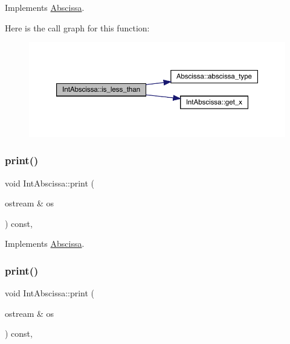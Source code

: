 Implements \mbox{\hyperlink{classAbscissa_a399c2f7a1309368b477c767ff5f63927}{Abscissa}}.

Here is the call graph for this function\+:
\nopagebreak
\begin{figure}[H]
\begin{center}
\leavevmode
\includegraphics[width=350pt]{d1/dd9/classIntAbscissa_a8aba17c6dc640344c56cd520d6c28be2_cgraph}
\end{center}
\end{figure}
\mbox{\label{classIntAbscissa_af26b6be609db09fbe544502b6606cff8}} 
\subsubsection{\texorpdfstring{print()}{print()}\hspace{0.1cm}{\footnotesize\ttfamily [1/2]}}
{\footnotesize\ttfamily void Int\+Abscissa\+::print (\begin{DoxyParamCaption}\item[{ostream \&}]{os }\end{DoxyParamCaption}) const\hspace{0.3cm}{\ttfamily [inline]}, {\ttfamily [virtual]}}



Implements \mbox{\hyperlink{classAbscissa_a98e122d32d82979bd30338abc15768fd}{Abscissa}}.

\mbox{\label{classIntAbscissa_af26b6be609db09fbe544502b6606cff8}} 
\subsubsection{\texorpdfstring{print()}{print()}\hspace{0.1cm}{\footnotesize\ttfamily [2/2]}}
{\footnotesize\ttfamily void Int\+Abscissa\+::print (\begin{DoxyParamCaption}\item[{ostream \&}]{os }\end{DoxyParamCaption}) const\hspace{0.3cm}{\ttfamily [inline]}, {\ttfamily [virtual]}}



